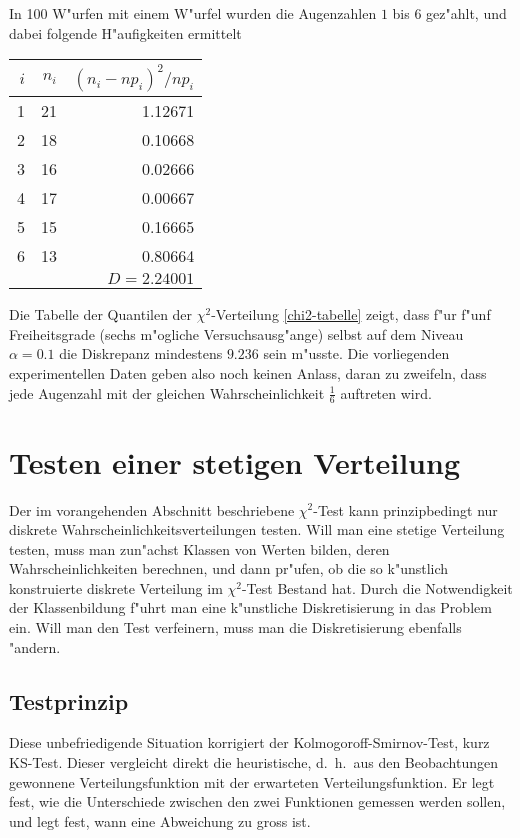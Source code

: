In 100 W"urfen mit einem W"urfel wurden die Augenzahlen $1$ bis $6$ gez"ahlt,
und dabei folgende H"aufigkeiten ermittelt
\begin{center}
\begin{tabular}{|r|r|r|}
\hline
$i$&$n_i$&$(n_i-np_i)^2/np_i$\\
\hline
1&21&1.12671\\
2&18&0.10668\\
3&16&0.02666\\
4&17&0.00667\\
5&15&0.16665\\
6&13&0.80664\\
\hline
&&$D=2.24001$\\
\hline
\end{tabular}
\end{center}
Die Tabelle der Quantilen der $\chi^2$-Verteilung \ref{chi2-tabelle}
zeigt, dass f"ur f"unf Freiheitsgrade (sechs m"ogliche Versuchsausg"ange)
selbst auf dem Niveau $\alpha=0.1$ die Diskrepanz mindestens $9.236$ sein
m"usste.
Die vorliegenden experimentellen Daten geben also noch keinen
Anlass, daran zu zweifeln, dass jede Augenzahl mit der gleichen
Wahrscheinlichkeit $\frac16$ auftreten wird.

\section{Testen einer stetigen Verteilung}
\label{section-testen-stetiger-wkeitsverteilung}
Der im vorangehenden Abschnitt beschriebene $\chi^2$-Test kann prinzipbedingt
nur diskrete Wahrscheinlichkeitsverteilungen testen.
Will man eine stetige
Verteilung testen, muss man zun"achst Klassen von Werten bilden,
deren Wahrscheinlichkeiten berechnen, und dann pr"ufen, ob die so
k"unstlich konstruierte diskrete Verteilung im $\chi^2$-Test Bestand hat.
Durch die Notwendigkeit der Klassenbildung f"uhrt man eine k"unstliche
Diskretisierung in das Problem ein.
Will man den Test verfeinern, muss man
die Diskretisierung ebenfalls "andern.

\subsection{Testprinzip}
Diese unbefriedigende Situation korrigiert der Kolmogoroff-Smirnov-Test,
kurz KS-Test.
Dieser vergleicht direkt die heuristische, d.~h.~aus den Beobachtungen gewonnene
Verteilungsfunktion mit der erwarteten Verteilungsfunktion.
Er legt fest,
wie die Unterschiede zwischen den zwei Funktionen gemessen werden sollen,
und legt fest, wann eine Abweichung zu gross ist.

